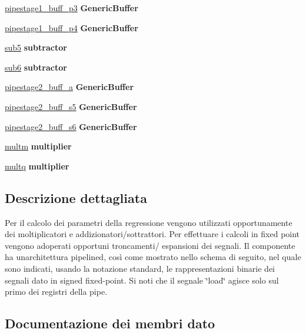 \begin{DoxyCompactItemize}
\item 
\hyperlink{class_linear_regression_1_1_structural_a561aaea076fe5b5174fc967b43b9a50b}{pipestage1\+\_\+buff\+\_\+p3}  {\bfseries Generic\+Buffer}   
\item 
\hyperlink{class_linear_regression_1_1_structural_a00c4727e954b8596179b1413d78368e3}{pipestage1\+\_\+buff\+\_\+p4}  {\bfseries Generic\+Buffer}   
\item 
\hyperlink{class_linear_regression_1_1_structural_a3fd26266a39105aca90e2b7b13923619}{sub5}  {\bfseries subtractor}   
\item 
\hyperlink{class_linear_regression_1_1_structural_aa1ef9174550e2c151dd776bd1b40a330}{sub6}  {\bfseries subtractor}   
\item 
\hyperlink{class_linear_regression_1_1_structural_a2b5633f36737627deb24a9d93d9bf872}{pipestage2\+\_\+buff\+\_\+a}  {\bfseries Generic\+Buffer}   
\item 
\hyperlink{class_linear_regression_1_1_structural_a6923b4db7acadf52a9972d4eebfa370f}{pipestage2\+\_\+buff\+\_\+s5}  {\bfseries Generic\+Buffer}   
\item 
\hyperlink{class_linear_regression_1_1_structural_af53a49707b23b6676f25d84a39920009}{pipestage2\+\_\+buff\+\_\+s6}  {\bfseries Generic\+Buffer}   
\item 
\hyperlink{class_linear_regression_1_1_structural_ae1287e267811d8909891ccf15264a835}{multm}  {\bfseries multiplier}   
\item 
\hyperlink{class_linear_regression_1_1_structural_aea9e41f3216a842c46f31aa5a569fc8f}{multq}  {\bfseries multiplier}   
\end{DoxyCompactItemize}


\subsection{Descrizione dettagliata}
Per il calcolo dei parametri della regressione vengono utilizzati opportunamente dei moltiplicatori e addizionatori/sottrattori. Per effettuare i calcoli in fixed point vengono adoperati opportuni troncamenti/ espansioni dei segnali. Il componente ha un\textquotesingle{}architettura pipelined, così come mostrato nello schema di seguito, nel quale sono indicati, usando la notazione standard, le rappresentazioni binarie dei segnali dato in signed fixed-\/point. Si noti che il segnale \char`\"{}load\char`\"{} agisce solo sul primo dei registri della pipe.  

\subsection{Documentazione dei membri dato}
